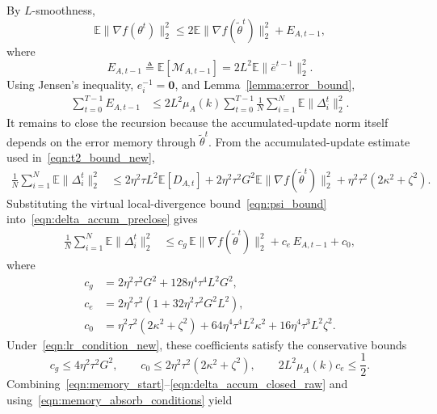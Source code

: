 \documentclass[conference]{IEEEtran}
\begin{document}
By $L$-smoothness,
\begin{equation}
    \mathbb{E}\|\nabla f(\theta^t)\|_2^2
    \le
    2\mathbb{E}\|\nabla f(\tilde\theta^t)\|_2^2+E_{A,t-1},
\end{equation}
where
\begin{equation}
    E_{A,t-1}
    \triangleq
    \mathbb{E}[\mathcal{M}_{A,t-1}]
    =2L^2\mathbb{E}\|\bar e^{t-1}\|_2^2.
\end{equation}
Using Jensen's inequality, $e_i^{-1}=\mathbf{0}$, and Lemma~\ref{lemma:error_bound},
\begin{align}
    \sum_{t=0}^{T-1}E_{A,t-1}
    &\le
    2L^2\mu_A(k)
    \sum_{t=0}^{T-1}\frac1N\sum_{i=1}^{N}\mathbb{E}\|\Delta_i^t\|_2^2.
    \label{eqn:memory_start}
\end{align}
It remains to close the recursion because the accumulated-update norm itself depends on the error memory through $\tilde\theta^t$.
From the accumulated-update estimate used in~\eqref{eqn:t2_bound_new},
\begin{align}
    \frac1N\sum_{i=1}^{N}\mathbb{E}\|\Delta_i^t\|_2^2
    &\le
    2\eta^2\tau L^2\mathbb{E}[D_{A,t}]
    +2\eta^2\tau^2G^2\mathbb{E}\|\nabla f(\tilde\theta^t)\|_2^2
    +\eta^2\tau^2(2\kappa^2+\zeta^2).
    \label{eqn:delta_accum_preclose}
\end{align}
Substituting the virtual local-divergence bound~\eqref{eqn:psi_bound} into~\eqref{eqn:delta_accum_preclose} gives
\begin{align}
    \frac1N\sum_{i=1}^{N}\mathbb{E}\|\Delta_i^t\|_2^2
    &\le
    c_{g}\,\mathbb{E}\|\nabla f(\tilde\theta^t)\|_2^2
    +c_{e}\,E_{A,t-1}
    +c_{0},
    \label{eqn:delta_accum_closed_raw}
\end{align}
where
\begin{align}
    c_g&=2\eta^2\tau^2G^2+128\eta^4\tau^4L^2G^2,\\
    c_e&=2\eta^2\tau^2\left(1+32\eta^2\tau^2G^2L^2\right),\\
    c_0&=\eta^2\tau^2(2\kappa^2+\zeta^2)
    +64\eta^4\tau^4L^2\kappa^2
    +16\eta^4\tau^3L^2\zeta^2.
\end{align}
Under~\eqref{eqn:lr_condition_new}, these coefficients satisfy the conservative bounds
\begin{equation}
    c_g\le 4\eta^2\tau^2G^2,
    \qquad
    c_0\le 2\eta^2\tau^2(2\kappa^2+\zeta^2),
    \qquad
    2L^2\mu_A(k)c_e\le \frac12.
    \label{eqn:memory_absorb_conditions}
\end{equation}
Combining~\eqref{eqn:memory_start}--\eqref{eqn:delta_accum_closed_raw} and using~\eqref{eqn:memory_absorb_conditions} yield
\end{document}
